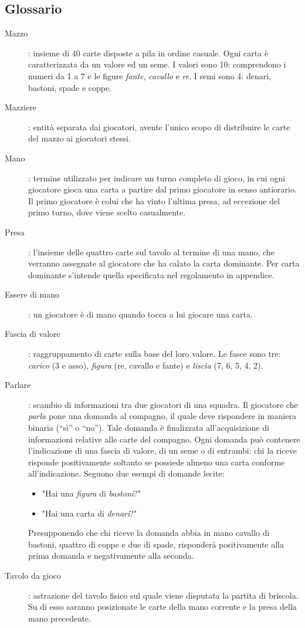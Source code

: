 \documentclass[a4paper,12pt]{article}
\begin{document}
\subsection{Glossario} \label{glossary}

\begin{description}
	\item[Mazzo]: insieme di 40 carte disposte a pila in ordine casuale. Ogni carta è caratterizzata da un valore ed un seme. I valori sono 10: comprendono i numeri da 1 a 7 e le figure \emph{fante}, \emph{cavallo} e \emph{re}. I semi sono 4: denari, bastoni, spade e coppe.
	\item[Mazziere]: entità separata dai giocatori, avente l'unico scopo di distribuire le carte del mazzo ai giocatori stessi. 
	\item[Mano]: termine utilizzato per indicare un turno completo di gioco, in cui ogni giocatore gioca una carta a partire dal primo giocatore in senso antiorario. Il primo giocatore è colui che ha vinto l'ultima presa, ad eccezione del primo turno, dove viene scelto casualmente.
	\item[Presa]: l'insieme delle quattro carte sul tavolo al termine di una mano, che verranno assegnate al giocatore che ha calato la carta dominante. Per carta dominante s'intende quella specificata nel regolamento in appendice.
	\item[Essere di mano]: un giocatore è di mano quando tocca a lui giocare una carta.
	\item[Fascia di valore]: raggruppamento di carte sulla base del loro valore. Le fasce sono tre: \emph{carico} (3 e asso), \emph{figura} (re, cavallo e fante) e \emph{liscia} (7, 6, 5, 4, 2).
	\item[Parlare]: scambio di informazioni tra due giocatori di una squadra. Il giocatore che \emph{parla} pone una domanda al compagno, il quale deve rispondere in maniera binaria (``sì'' o ``no''). Tale domanda è finalizzata all'acquisizione di informazioni relative alle carte del compagno. Ogni domanda può contenere l'indicazione di una fascia di valore, di un seme o di entrambi: chi la riceve risponde positivamente soltanto se possiede almeno una carta conforme all'indicazione. Seguono due esempi di domande lecite:
	\begin{itemize}
		\item "Hai una \emph{figura} di \emph{bastoni}?"
		\item "Hai una carta di \emph{denari}?"
	\end{itemize} 
	Presupponendo che chi riceve la domanda abbia in mano cavallo di bastoni, quattro di coppe e due di spade, risponderà positivamente alla prima domanda e negativamente alla seconda.   
	\item[Tavolo da gioco]: astrazione del tavolo fisico sul quale viene disputata la partita di briscola. Su di esso saranno posizionate le carte della mano corrente e la presa della mano precedente.
\end{description}
\end{document}
